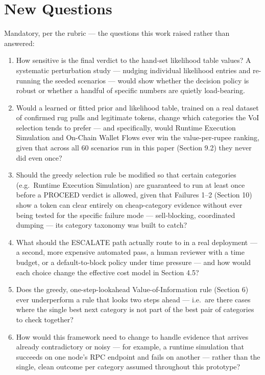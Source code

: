 \documentclass[11pt]{article}
\begin{document}
\section{New Questions}

Mandatory, per the rubric --- the questions this work raised rather than answered:

\begin{enumerate}
    \item How sensitive is the final verdict to the hand-set likelihood table values? A systematic perturbation study --- nudging individual likelihood entries and re-running the seeded scenarios --- would show whether the decision policy is robust or whether a handful of specific numbers are quietly load-bearing.

    \item Would a learned or fitted prior and likelihood table, trained on a real dataset of confirmed rug pulls and legitimate tokens, change which categories the VoI selection tends to prefer --- and specifically, would Runtime Execution Simulation and On-Chain Wallet Flows ever win the value-per-rupee ranking, given that across all 60 scenarios run in this paper (Section 9.2) they never did even once?

    \item Should the greedy selection rule be modified so that certain categories (e.g.\ Runtime Execution Simulation) are guaranteed to run at least once before a PROCEED verdict is allowed, given that Failures 1--2 (Section 10) show a token can clear entirely on cheap-category evidence without ever being tested for the specific failure mode --- sell-blocking, coordinated dumping --- its category taxonomy was built to catch?

    \item What should the ESCALATE path actually route to in a real deployment --- a second, more expensive automated pass, a human reviewer with a time budget, or a default-to-block policy under time pressure --- and how would each choice change the effective cost model in Section 4.5?

    \item Does the greedy, one-step-lookahead Value-of-Information rule (Section 6) ever underperform a rule that looks two steps ahead --- i.e.\ are there cases where the single best next category is not part of the best pair of categories to check together?

    \item How would this framework need to change to handle evidence that arrives already contradictory or noisy --- for example, a runtime simulation that succeeds on one node's RPC endpoint and fails on another --- rather than the single, clean outcome per category assumed throughout this prototype?
\end{enumerate}
\end{document}
